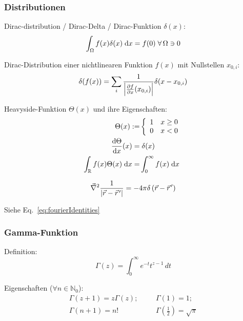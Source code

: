 		\subsubsection{Distributionen}
			\noindent
			Dirac-distribution / Dirac-Delta / Dirac-Funktion $\delta(x)$:
			\begin{equation}
				\int_\Omega f(x)\delta(x)\;\mathrm{d} x = f(0)\;\forall\, \Omega\ni 0
			\end{equation}

			\noindent
			Dirac-Distribution einer nichtlinearen Funktion $f(x)$ mit Nullstellen $x_{0,i}$:
			\begin{equation}
				\delta(f(x)) = \sum_i \frac{1}{\left|\frac{\partial f}{\partial x}(x_{0,i})\right|}\delta(x-x_{0,i})
			\end{equation}

			\noindent
			Heavyside-Funktion $\Theta(x)$ und ihre Eigenschaften:
			\begin{equation}
				\begin{aligned}
					\Theta(x) :=& \left\{\begin{array}{ll}
						1 & x\ge 0 \\
						0 & x<0 \\
						\end{array}\right. \\
						\frac{\mathrm{d} \Theta}{\mathrm{d} x}(x) =&\; \delta(x) \\
					\int_{\mathbb{R}} f(x)\Theta(x)\;\mathrm{d} x =& \int_{0}^{\infty} f(x)\;\mathrm{d} x
				\end{aligned}
			\end{equation}

			\begin{equation}
				\Nabla^2\frac{1}{\left|\vec{r} - \pvec{r}'\right|} = -4\pi\delta\left(\vec{r} - \pvec{r}'\right)
			\end{equation}

			\noindent
			Siehe Eq.~\ref{eq:fourierIdentities}

		\subsubsection{Gamma-Funktion}
			\noindent
			Definition:
			\begin{equation}
				\Gamma(z)=\int_0^{\infty}e^{-t}t^{z-1}\,dt
			\end{equation}

			\noindent
			Eigenschaften ($\forall n\in\mathbb{N}_0$):
			\begin{equation}
				\begin{array}{cc}
					\Gamma(z+1)=z\Gamma(z);
					&\hspace{20pt} \Gamma\left(1 \right)=1; \\
					\Gamma(n+1) = n!
					&\hspace{20pt} \Gamma\left(\frac{1}{2} \right)=\sqrt{\pi} \\
				\end{array}
			\end{equation}

